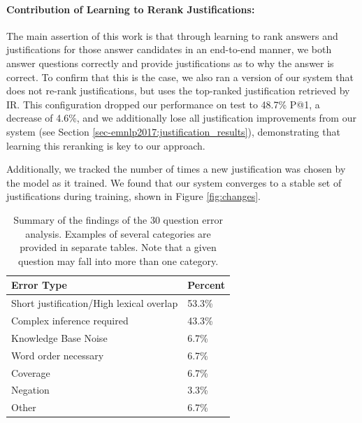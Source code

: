 \paragraph{Contribution of Learning to Rerank Justifications:}
The main assertion of this work is that through learning to rank answers and justifications for those answer candidates in an end-to-end manner, we both answer questions correctly and provide justifications as to why the answer is correct.  To confirm that this is the case, we also ran a version of our system that does not re-rank justifications, but uses the top-ranked justification retrieved by IR.  This configuration dropped our performance on test to 48.7\% P@1, a decrease of 4.6\%, and we additionally lose all justification improvements from our system (see Section \ref{sec-emnlp2017:justification_results}), demonstrating that learning this reranking is key to our approach.

Additionally, we tracked the number of times a new justification was chosen by the model as it trained. We found that our system converges to a stable set of justifications during training, shown in Figure \ref{fig:changes}.



\begin{table}[t]
\begin{center}
\begin{tabular}{ll}
\hline
Error Type & Percent \\ 
\hline
Short justification/High lexical overlap  & 53.3\%\\
Complex inference required   & 43.3\% \\
Knowledge Base Noise  & 6.7\% \\
Word order necessary	 & 6.7\% \\
Coverage & 6.7\% \\
Negation	& 3.3\% \\
Other & 6.7\% \\
\end{tabular}

\caption{{ Summary of the findings of the 30 question error analysis.  
Examples of several categories are provided in separate tables. 
Note that a given question may fall into more than one category.}} 
\label{tab:erroranalysis}
\vspace{-5mm}
\end{center}
\end{table}

